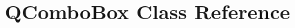 \hypertarget{classGUI_1_1QComboBox}{}\section{Q\+Combo\+Box Class Reference}
\label{classGUI_1_1QComboBox}
